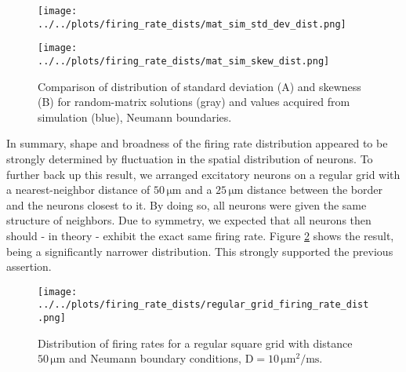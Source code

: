 \documentclass[10pt,a4paper]{article}
\begin{document}
\begin{figure}
\begin{minipage}{0.5\textwidth}
\texttt{[image: ../../plots/firing\_rate\_dists/mat\_sim\_std\_dev\_dist.png]}
\end{minipage}
\begin{minipage}{0.5\textwidth}
\texttt{[image: ../../plots/firing\_rate\_dists/mat\_sim\_skew\_dist.png]}
\end{minipage}
\caption{Comparison of distribution of standard deviation (A) and skewness (B) for random-matrix solutions (gray) and values acquired from simulation (blue), Neumann boundaries.}
\label{Std_Skew_Dist_vs_Data}
\end{figure}
In summary, shape and broadness of the firing rate distribution appeared to be strongly determined by fluctuation in the spatial distribution of neurons. To further back up this result, we arranged excitatory neurons on a regular grid with a nearest-neighbor distance of $\mathrm{50\, \mu m}$ and a $\mathrm{25\, \mu m}$ distance between the border and the neurons closest to it. By doing so, all neurons were given the same structure of neighbors. Due to symmetry, we expected that all neurons then should - in theory - exhibit the exact same firing rate. Figure \ref{Fir_Rate_Dist_Reg_Grid} shows the result, being a significantly narrower distribution. This strongly supported the previous assertion.
\begin{figure}
\begin{center}
\texttt{[image: ../../plots/firing\_rate\_dists/regular\_grid\_firing\_rate\_dist.png]}
\end{center}
\caption{Distribution of firing rates for a regular square grid with distance $\mathrm{50\, \mu m}$ and Neumann boundary conditions, $\mathrm{D=10\,\mu m^2/ms}$.}
\label{Fir_Rate_Dist_Reg_Grid}
\end{figure}  
\end{document}
